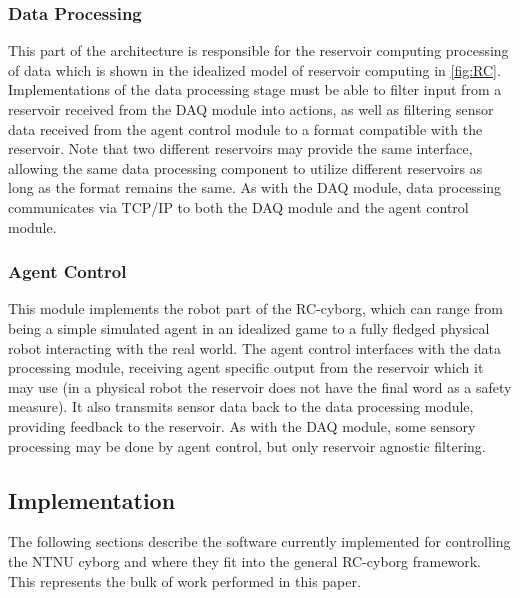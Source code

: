 \subsubsection{Data Processing}
This part of the architecture is responsible for the reservoir computing
processing of data which is shown in the idealized model of reservoir computing in
\ref{fig:RC}.
Implementations of the data processing stage must be able to filter input from
a reservoir received from the DAQ module into actions, as well as filtering
sensor data received from the agent control module to a format compatible with
the reservoir.
Note that two different reservoirs may provide the same interface, allowing the
same data processing component to utilize different reservoirs as long as the
format remains the same.
As with the DAQ module, data processing communicates via TCP/IP to both the DAQ
module and the agent control module.
\subsubsection{Agent Control}
This module implements the robot part of the RC-cyborg, which can range from
being a simple simulated agent in an idealized game to a fully fledged physical
robot interacting with the real world.
The agent control interfaces with the data processing module, receiving agent
specific output from the reservoir which it may use (in a physical robot the
reservoir does not have the final word as a safety measure).
It also transmits sensor data back to the data processing module, providing
feedback to the reservoir.
As with the DAQ module, some sensory processing may be done by agent control,
but only reservoir agnostic filtering.
\subsection{Implementation} 
The following sections describe the software currently implemented for
controlling the NTNU cyborg and where they fit into the general RC-cyborg
framework.
This represents the bulk of work performed in this paper.
